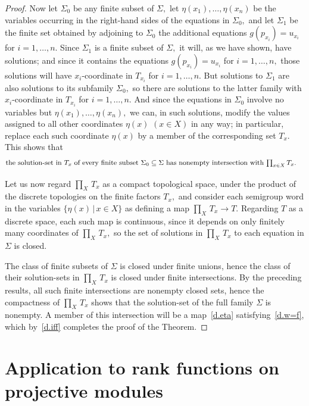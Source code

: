 \documentclass{amsart}
\numberwithin{equation}{section}
\numberwithin{theorem}{section}
\newcommand{\2}{\mathbf{2}}
\begin{document}
\begin{proof}
Now let $\Sigma_0$ be any finite subset of $\Sigma,$ let
$\eta(x_1),\dots,\eta(x_n)$ be the variables occurring in
the right-hand sides of the equations in $\Sigma_0,$ and
let $\Sigma_1$ be the finite set obtained by adjoining to
$\Sigma_0$ the additional
equations $g(p_{x_i})=u_{x_i}$ for $i=1,\dots,n.$
Since $\Sigma_1$ is a finite subset
of $\Sigma,$ it will, as we have shown, have
solutions; and since it contains the equations
$g(p_{x_i}) = u_{x_i}$ for $i=1,\dots,n,$
those solutions will have $\!x_i\!$-coordinate in $T_{x_i}$
for $i=1,\dots,n.$
But solutions to $\Sigma_1$ are
also solutions to its subfamily $\Sigma_0,$ so
there are solutions to the latter family
with $\!x_i\!$-coordinate in $T_{x_i}$ for $i=1,\dots,n.$
And since the equations in $\Sigma_0$ involve no variables
but $\eta(x_1),\dots,\eta(x_n),$ we can, in such solutions,
modify the values assigned to all other coordinates
$\eta(x)$ $(x\in X)$
in any way; in particular, replace each such coordinate $\eta(x)$
by a member of the corresponding set $T_x.$
This shows that
%
\begin{equation}\begin{minipage}[c]{35pc}\label{d.in_prod_T_i}
the solution-set in $T_x$
of every finite subset $\Sigma_0\subseteq\Sigma$
has nonempty intersection with $\prod_{x\in X} T_x.$
\end{minipage}\end{equation}

Let us now regard $\prod_X\,T_x$
as a compact topological space, under the product of the
discrete topologies on the finite factors $T_x,$ and consider each
semigroup word in the variables $\{\eta(x)\,|\,x\in X\}$ as defining a
map $\prod_X\,T_x\to T.$
Regarding $T$ as a discrete space,
each such map is continuous, since it depends on only
finitely many coordinates of $\prod_X\,T_x,$ so the
set of solutions in $\prod_X\,T_x$ to
each equation in $\Sigma$ is closed.

The class of finite subsets of $\Sigma$ is closed
under finite unions, hence the class of their solution-sets in
$\prod_X\,T_x$ is closed under finite intersections.
By the preceding results, all such finite intersections are
nonempty closed sets,
hence the compactness of $\prod_X\,T_x$ shows that the solution-set of
the full family $\Sigma$ is nonempty.
A member of this intersection will be a map~\eqref{d.eta}
satisfying~\eqref{d.w=f},
which by~\eqref{d.iff} completes the proof of the Theorem.
\end{proof}

\section{Application to rank functions on projective modules}\label{S.rank}
\end{document}
